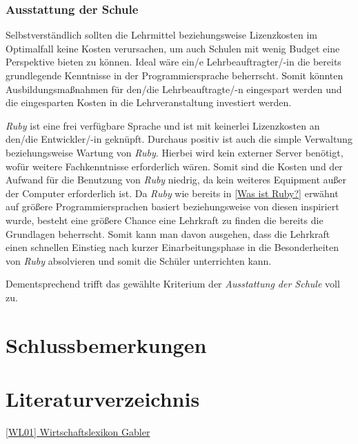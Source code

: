 \documentclass[12pt,DIV=14, version=first, BCOR=10mm,a4paper,twoside,parskip=half-,headsepline,headinclude]{scrartcl}
\begin{document}
\subsubsection{Ausstattung der Schule}
\begin{flushleft}
Selbstverständlich sollten die Lehrmittel beziehungsweise Lizenzkosten im Optimalfall keine Kosten verursachen, um auch Schulen mit wenig Budget eine Perspektive bieten zu können. Ideal wäre ein/e Lehrbeauftragter/-in die bereits grundlegende Kenntnisse in der Programmiersprache beherrscht. Somit könnten Ausbildungsmaßnahmen für den/die Lehrbeauftragte/-n eingespart werden und die eingesparten Kosten in die Lehrveranstaltung investiert werden.

\textit{\glqq Ruby\grqq} ist eine frei verfügbare Sprache und ist mit keinerlei Lizenzkosten an den/die Entwickler/-in geknüpft. Durchaus positiv ist auch die simple Verwaltung beziehungsweise Wartung von \textit{\glqq Ruby\grqq}. Hierbei wird kein externer Server benötigt, wofür weitere Fachkenntnisse erforderlich wären. Somit sind die Kosten und der Aufwand für die Benutzung von \textit{\glqq Ruby\grqq} niedrig, da kein weiteres Equipment außer der Computer erforderlich ist. Da \textit{\glqq Ruby\grqq} wie bereits in \ref{Was ist Ruby?} erwähnt auf größere Programmiersprachen basiert beziehungsweise von diesen inspiriert wurde, besteht eine größere Chance eine Lehrkraft zu finden die bereits die Grundlagen beherrscht. Somit kann man davon ausgehen, dass die Lehrkraft einen schnellen Einstieg nach kurzer Einarbeitungsphase in die Besonderheiten von \textit{\glqq Ruby\grqq} absolvieren und somit die Schüler unterrichten kann.

Dementsprechend trifft das gewählte Kriterium der \textit{Ausstattung der Schule} voll zu.
\end{flushleft}

\pagebreak
\section{Schlussbemerkungen}
\begin{flushleft} 

\end{flushleft}

\pagebreak


\section{Literaturverzeichnis}
\begin{flushleft}
\href{https://wirtschaftslexikon.gabler.de/definition/objektorientierung-43907} {[WL01] Wirtschaftslexikon Gabler}
\end{flushleft}
\end{document}
